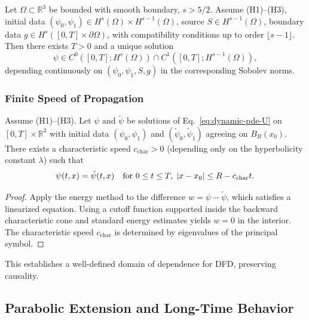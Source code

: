 \begin{theorem}\label{thm:ibvp-U}
Let $\Omega \subset \mathbb{R}^3$ be bounded with smooth boundary, $s > 5/2$. 
Assume (H1)--(H3), initial data $(\psi_0, \psi_1) \in H^s(\Omega) \times H^{s-1}(\Omega)$, 
source $S \in H^{s-1}(\Omega)$, boundary data $g \in H^s([0,T] \times \partial\Omega)$, 
with compatibility conditions up to order $\lfloor s-1 \rfloor$. Then there 
exists $T > 0$ and a unique solution
\begin{equation}
\psi \in C^0([0,T]; H^s(\Omega)) \cap C^1([0,T]; H^{s-1}(\Omega)),
\end{equation}
depending continuously on $(\psi_0, \psi_1, S, g)$ in the corresponding Sobolev norms.
\end{theorem}

\subsubsection{Finite Speed of Propagation}

\begin{theorem}\label{thm:finite-speed-U}
Assume (H1)--(H3). Let $\psi$ and $\tilde{\psi}$ be solutions of 
Eq.~\eqref{eq:dynamic-pde-U} on $[0,T] \times \mathbb{R}^3$ with initial data 
$(\psi_0, \psi_1)$ and $(\tilde{\psi}_0, \tilde{\psi}_1)$ agreeing on $B_R(x_0)$. 
There exists a characteristic speed $c_{\mathrm{char}} > 0$ (depending only on 
the hyperbolicity constant $\lambda$) such that
\begin{equation}
\psi(t,x) = \tilde{\psi}(t,x) \quad \text{for } 0 \leq t \leq T,\; |x - x_0| \leq R - c_{\rm char}t.
\end{equation}
\end{theorem}

\begin{proof}
Apply the energy method to the difference $w = \psi - \tilde{\psi}$, which 
satisfies a linearized equation. Using a cutoff function supported inside the 
backward characteristic cone and standard energy estimates yields $w = 0$ in 
the interior. The characteristic speed $c_{\mathrm{char}}$ is determined by 
eigenvalues of the principal symbol.
\end{proof}

This establishes a well-defined domain of dependence for DFD, preserving causality.

\subsection{Parabolic Extension and Long-Time Behavior}\label{app:well-parabolic}

